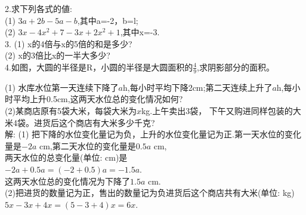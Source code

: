 \documentclass[UTF8]{report}
\theoremstyle{definition}
\theoremstyle{remark}
\begin{document}
\begin{exercise}2.求下列各式的値:
\\(1) $3a+2b-5a-b$,其中a=-2，b=l;\\(2) $3x-4x^{2}+7-3x+2x^{2}+1$,其中x=-3.
\\3. (1) x的4倍与x的5倍的和是多少?
\\(2) x的3倍比x的一半大多少?
\\4.如图，大圆的半径是R，小圆的半径是大圆面积的$\frac{4}{9}$,求阴影部分的面积。
\end{exercise}

\begin{exercise}
(1) 水库水位第一天连续下降了$a$h,每小时平均下降2cm;第二天连续上升了$a$h,每小时平均上升0.5cm,这两天水位总的变化情况如何?
\\(2)某商店原有5袋大米，每袋大米为$x$kg.上午卖出3袋， 下午又购进同样包装的大米4袋。进货后这个商店有大米多少千克?
\\ 解: (1) 把下降的水位变化量记为负，上升的水位变化量记为正.第一天水位的变化量是$-2a$ cm,第二天水位的变化量是$0.5a$ cm,
\\ 两天水位的总变化量(单位: cm)是
\\  $-2a+0.5a=(-2+0.5)a= -1.5a$.
\\ 这两天水位总的变化情况为下降了$1.5a$ cm.
\\ (2)把进货的数量记为正，售出的数量记为负进货后这个商店共有大米(单位: kg)
\\  $5x-3x+4x=(5-3+4)x=6x$.
\end{exercise}
\end{document}
